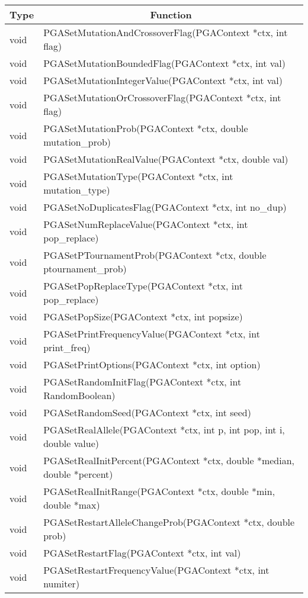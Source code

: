 \documentclass{report}
\begin{document}
\begin{tabular}{|l|l|} \hline\hline
\multicolumn{1}{|c|}{Type} &
\multicolumn{1}{c|}{Function}  \\  \hline\hline
void &  PGASetMutationAndCrossoverFlag(PGAContext *ctx, int flag) \\ \hline
void &  PGASetMutationBoundedFlag(PGAContext *ctx, int val) \\ \hline
void &  PGASetMutationIntegerValue(PGAContext *ctx, int val) \\ \hline
void &  PGASetMutationOrCrossoverFlag(PGAContext *ctx, int flag) \\ \hline
void &  PGASetMutationProb(PGAContext *ctx, double mutation\_prob) \\ \hline
void &  PGASetMutationRealValue(PGAContext *ctx, double val) \\ \hline
void &  PGASetMutationType(PGAContext *ctx, int mutation\_type) \\ \hline
void &  PGASetNoDuplicatesFlag(PGAContext *ctx, int no\_dup) \\ \hline
void &  PGASetNumReplaceValue(PGAContext *ctx, int pop\_replace) \\ \hline
void &  PGASetPTournamentProb(PGAContext *ctx, double ptournament\_prob) \\ \hline
void &  PGASetPopReplaceType(PGAContext *ctx, int pop\_replace) \\ \hline
void &  PGASetPopSize(PGAContext *ctx, int popsize) \\ \hline
void &  PGASetPrintFrequencyValue(PGAContext *ctx, int print\_freq) \\ \hline
void &  PGASetPrintOptions(PGAContext *ctx, int option) \\ \hline
void &  PGASetRandomInitFlag(PGAContext *ctx, int RandomBoolean) \\ \hline
void &  PGASetRandomSeed(PGAContext *ctx, int seed) \\ \hline
void &  PGASetRealAllele(PGAContext *ctx, int p, int pop, int i, double value)
\\ \hline
void &  PGASetRealInitPercent(PGAContext *ctx, double *median, double
*percent) \\ \hline
void &  PGASetRealInitRange(PGAContext *ctx, double *min, double *max) \\ \hline
void &  PGASetRestartAlleleChangeProb(PGAContext *ctx, double prob) \\ \hline
void &  PGASetRestartFlag(PGAContext *ctx, int val) \\ \hline
void &  PGASetRestartFrequencyValue(PGAContext *ctx, int numiter) \\ \hline

\end{tabular}
\end{document}
